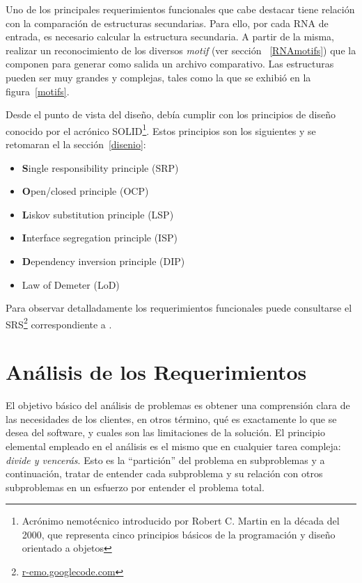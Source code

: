\par Uno de los principales requerimientos funcionales que cabe destacar tiene relación con la comparación de estructuras secundarias. Para ello, por cada RNA de entrada, es necesario calcular la estructura secundaria. A partir de la misma, realizar un reconocimiento de los diversos \emph{motif} (ver sección ~\ref{RNAmotifs}) que la componen para generar como salida un archivo comparativo. Las estructuras pueden ser muy grandes y complejas, tales como la que se exhibió en la figura~\ref{motifs}.

\par Desde el punto de vista del diseño, \remo debía cumplir con los principios de diseño conocido por el acrónico SOLID\footnote{Acrónimo nemotécnico introducido por Robert C. Martin en la década del 2000, que representa cinco principios básicos de la programación y diseño orientado a objetos}\cite{Martin00}. Estos principios son los siguientes y se retomaran el la sección~\ref{disenio}:
\begin{itemize}
	\item \textbf{S}ingle responsibility principle (SRP)
	\item \textbf{O}pen/closed principle (OCP)
	\item \textbf{L}iskov substitution principle (LSP)
	\item \textbf{I}nterface segregation principle (ISP)
	\item \textbf{D}ependency inversion principle (DIP)	
	\item Law of Demeter (LoD)
\end{itemize}

\par Para observar detalladamente los requerimientos funcionales puede consultarse el SRS\footnote{\url{r-emo.googlecode.com}} correspondiente a \remo.

\section{Análisis de los Requerimientos}
\par El objetivo básico del análisis de problemas es obtener una comprensión clara de las necesidades de los clientes, en otros término, qué es exactamente lo que se desea del software, y cuales son las limitaciones de la solución. El principio elemental empleado en el análisis es el mismo que en cualquier tarea compleja: \emph{divide y vencerás}. Esto es la “partición” del problema en subproblemas y a continuación, tratar de entender cada subproblema y su relación con otros subproblemas en un esfuerzo por entender el problema total.

